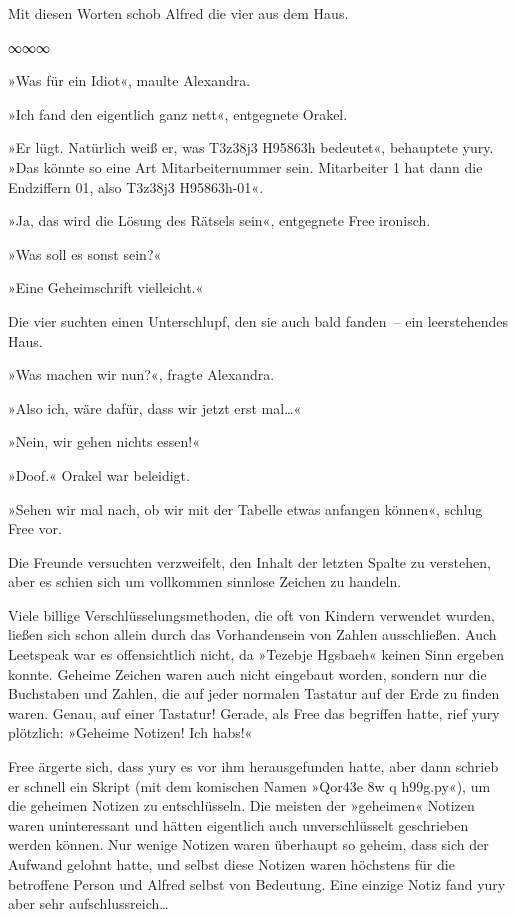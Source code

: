 Mit diesen Worten schob Alfred die vier aus dem Haus.

\begin{center}
    ∞∞∞
\end{center}

»Was für ein Idiot«, maulte Alexandra.

»Ich fand den eigentlich ganz nett«, entgegnete Orakel.

»Er lügt. Natürlich weiß er, was T3z38j3 H95863h bedeutet«, behauptete yury. »Das könnte so eine Art Mitarbeiternummer sein. Mitarbeiter 1 hat dann die Endziffern 01, also T3z38j3 H95863h-01«.

»Ja, das wird die Lösung des Rätsels sein«, entgegnete Free ironisch.

»Was soll es sonst sein?«

»Eine Geheimschrift vielleicht.«

Die vier suchten einen Unterschlupf, den sie auch bald fanden~– ein leerstehendes Haus.

»Was machen wir nun?«, fragte Alexandra.

»Also ich, wäre dafür, dass wir jetzt erst mal…«

»Nein, wir gehen nichts essen!«

»Doof.« Orakel war beleidigt.

»Sehen wir mal nach, ob wir mit der Tabelle etwas anfangen können«, schlug Free vor.

Die Freunde versuchten verzweifelt, den Inhalt der letzten Spalte zu verstehen, aber es schien sich um vollkommen sinnlose Zeichen zu handeln.

Viele billige Verschlüsselungsmethoden, die oft von Kindern verwendet wurden, ließen sich schon allein durch das Vorhandensein von Zahlen ausschließen. Auch Leetspeak war es offensichtlich nicht, da »Tezebje Hgsbaeh« keinen Sinn ergeben konnte. Geheime Zeichen waren auch nicht eingebaut worden, sondern nur die Buchstaben und Zahlen, die auf jeder normalen Tastatur auf der Erde zu finden waren. Genau, auf einer Tastatur! Gerade, als Free das begriffen hatte, rief yury plötzlich: »Geheime Notizen! Ich habs!«

Free ärgerte sich, dass yury es vor ihm herausgefunden hatte, aber dann schrieb er schnell ein Skript (mit dem komischen Namen »Qor43e 8w q h99g.py«), um die geheimen Notizen zu entschlüsseln. Die meisten der »geheimen« Notizen waren uninteressant und hätten eigentlich auch unverschlüsselt geschrieben werden können. Nur wenige Notizen waren überhaupt so geheim, dass sich der Aufwand gelohnt hatte, und selbst diese Notizen waren höchstens für die betroffene Person und Alfred selbst von Bedeutung. Eine einzige Notiz fand yury aber sehr aufschlussreich…

